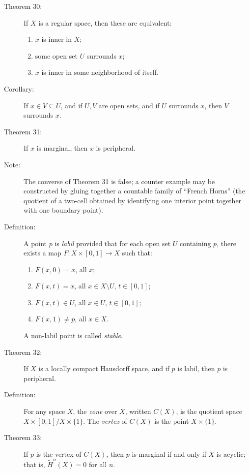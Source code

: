\documentclass{article}
\begin{document}
\begin{description}
\item[Theorem 30:] If $X$ is a regular space, then these are equivalent:
  \begin{enumerate}[\hspace{1cm}(1)]
    \item $x$ is inner in $X$;
    \item some open set $U$ surrounds $x$;
    \item $x$ is inner in some neighborhood of itself.
  \end{enumerate}

\item[Corollary:] If $x \in V \subseteq U$, and if $U,V$ are open sets, and if $U$ surrounds $x$, then $V$ surrounds $x$.

\item[Theorem 31:] If $x$ is marginal, then $x$ is peripheral.

\item[Note:] The converse of Theorem 31 is false; a counter example may be constructed by gluing together a countable family of ``French Horns'' (the quotient of a two-cell obtained by identifying one interior point together with one boundary point).

\item[Definition:] A point $p$ is \emph{labil} provided that for each open set $U$ containing $p$, there exists a map $F: X \times [0,1] \longrightarrow X$ such that:
  \begin{enumerate}[\hspace{1cm}(1)]
    \item $F(x,0)=x$, all $x$;
    \item $F(x,t)=x$, all $x \in X \setminus U$, $t \in [0,1]$;
    \item $F(x,t) \in U$, all $x \in U$, $t \in [0,1]$;
    \item $F(x,1) \neq p$, all $x \in X$.
  \end{enumerate}

  A non-labil point is called \emph{stable}.

\item[Theorem 32:] If $X$ is a locally compact Hausdorff space, and if $p$ is labil, then $p$ is peripheral.

\item[Definition:] For any space $X$, the \emph{cone} over $X$, written $C(X)$, is the quotient space $X \times [0,1] / X \times \{ 1 \}$. The \emph{vertex} of $C(X)$ is the point $X \times \{ 1 \}$.

\item[Theorem 33:] If $p$ is the vertex of $C(X)$, then $p$ is marginal if and only if $X$ is acyclic; that is, $\widetilde{H}^n(X)=0$ for all $n$.


\end{description}
\end{document}
